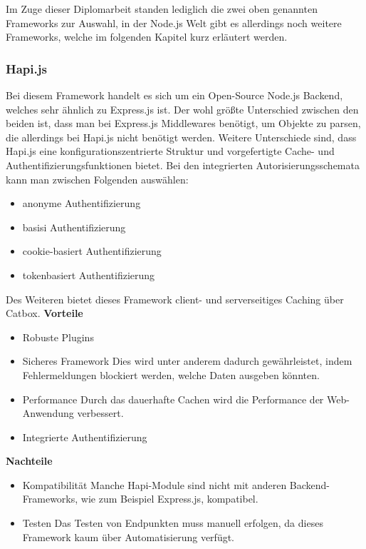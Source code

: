 Im Zuge dieser Diplomarbeit standen lediglich die zwei oben genannten Frameworks zur Auswahl, in der Node.js Welt gibt es allerdings noch weitere Frameworks, welche im folgenden Kapitel kurz erläutert werden.

\subsubsection{Hapi.js}
Bei diesem Framework handelt es sich um ein Open-Source Node.js Backend, welches sehr ähnlich zu Express.js ist. Der wohl größte Unterschied zwischen den beiden ist, dass man bei Express.js Middlewares benötigt, um Objekte zu parsen, die allerdings bei Hapi.js nicht benötigt werden. Weitere Unterschiede sind, dass Hapi.js eine konfigurationszentrierte Struktur und vorgefertigte Cache- und Authentifizierungsfunktionen bietet. Bei den integrierten Autorisierungsschemata kann man zwischen Folgenden auswählen:
\begin{itemize}
    \item anonyme Authentifizierung
    \item basisi Authentifizierung
    \item cookie-basiert Authentifizierung
    \item tokenbasiert Authentifizierung
\end{itemize}
Des Weiteren bietet dieses Framework client- und serverseitiges Caching über Catbox.
\newline
\textbf{Vorteile}
\begin{itemize}
    \item Robuste Plugins
    \item Sicheres Framework
        \newline
        Dies wird unter anderem dadurch gewährleistet, indem Fehlermeldungen blockiert werden, welche Daten ausgeben könnten.
    \item Performance
        \newline
        Durch das dauerhafte Cachen wird die Performance der Web-Anwendung verbessert.
    \item Integrierte Authentifizierung
\end{itemize}

\textbf{Nachteile}
\begin{itemize}
    \item Kompatibilität
        \newline
        Manche Hapi-Module sind nicht mit anderen Backend-Frameworks, wie zum Beispiel Express.js, kompatibel.
    \item Testen
        \newline
        Das Testen von Endpunkten muss manuell erfolgen, da dieses Framework kaum über Automatisierung verfügt.
\end{itemize}
\cite{backend_hapi}

